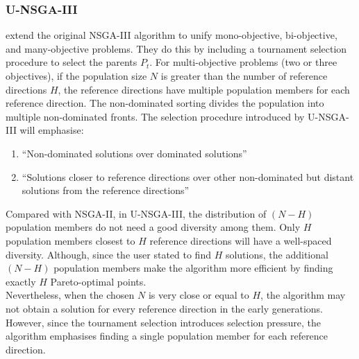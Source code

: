\documentclass[mscthesis, 11pt]{usiinfthesis}
\theoremstyle{newdefinition}
\begin{document}
\subsubsection{U-NSGA-III}\label{sec:unsga3}
\cite[~p.~361]{seada_unified_2016} extend the original NSGA-III algorithm to unify mono-objective, bi-objective, and many-objective problems. They do this by including a tournament selection procedure to select the parents $P_t$. For multi-objective problems (two or three objectives), if the population size $N$ is greater than the number of reference directions $H$, the reference directions have multiple population members for each reference direction. The non-dominated sorting divides the population into multiple non-dominated fronts. The selection procedure introduced by U-NSGA-III will emphasise:
\begin{enumerate}
    \item ``Non-dominated solutions over dominated solutions'' \cite[~p.~362]{seada_unified_2016}
    \item ``Solutions closer to reference directions over other non-dominated but distant solutions from the reference directions'' \cite[~p.~363]{seada_unified_2016}
\end{enumerate}
Compared with NSGA-II, in U-NSGA-III, the distribution of $(N - H)$ population members do not need a good diversity among them. Only $H$ population members closest to $H$ reference directions will have a well-spaced diversity. Although, since the user stated to find $H$ solutions, the additional $(N - H)$ population members make the algorithm more efficient by finding exactly $H$ Pareto-optimal points.
\\
Nevertheless, when the chosen $N$ is very close or equal to $H$, the algorithm may not obtain a solution for every reference direction in the early generations. However, since the tournament selection introduces selection pressure, the algorithm emphasises finding a single population member for each reference direction.
\end{document}
